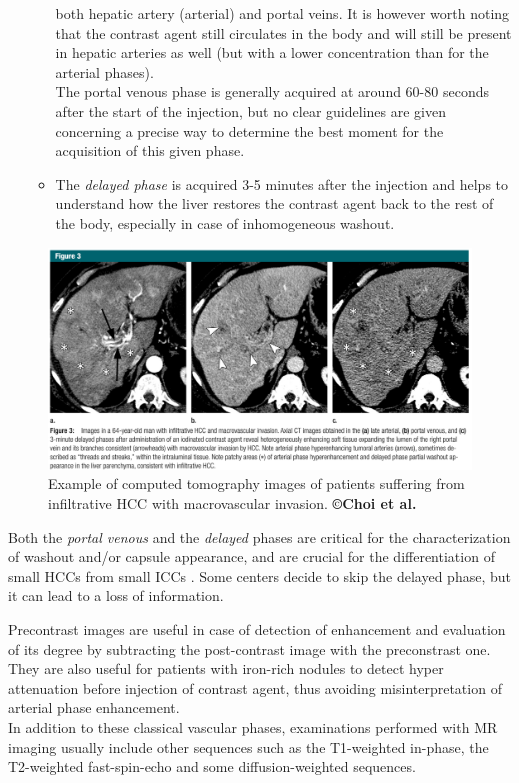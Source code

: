 \begin{itemize}
\begin{itemize}
    both hepatic artery (arterial) and portal veins. It is however worth
    noting that the contrast agent still circulates in the body and will
    still be present in hepatic arteries as well (but with a lower
    concentration than for the arterial phases).\\
    The portal venous phase is generally acquired at around 60-80
    seconds after the start of the injection, but no clear guidelines
    are given concerning a precise way to determine the best moment for
    the acquisition of this given phase.
  \item The \emph{delayed phase} is acquired 3-5 minutes after the injection
    and helps to understand how the liver restores the contrast agent
    back to the rest of the body, especially in case of inhomogeneous
    washout.
  \end{itemize}
\end{itemize}
\begin{figure}[th!]
\centering
\includegraphics[width=0.9\linewidth]{images/image15}
\caption{Example of computed tomography images of patients suffering from infiltrative HCC with macrovascular invasion. \textbf{©Choi et al. \cite{Choi2014a}}}
\label{Choi2014a_Fig3}
\end{figure}

Both the \emph{portal venous} and the \emph{delayed} phases are critical
for the characterization of washout and/or capsule appearance, and are
crucial for the differentiation of small HCCs from small
ICCs \cite{Iannaccone2005,Rimola2009}. Some centers decide
to skip the delayed phase, but it can lead to a loss of information.

Precontrast images are useful in case of detection of enhancement
and evaluation of its degree by subtracting the post-contrast image with
the preconstrast one. They are also useful for patients with iron-rich
nodules to detect hyper attenuation before injection of contrast agent,
thus avoiding misinterpretation of arterial phase enhancement.\\
In addition to these classical vascular phases, examinations performed
with MR imaging usually include other sequences such as the T1-weighted
in-phase, the T2-weighted fast-spin-echo and some diffusion-weighted
sequences.\\




